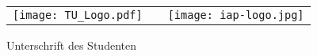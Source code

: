 \begin{titlepage}
	
	\begin{tabular}{lcr}
		\texttt{[image: TU\_Logo.pdf]} & %
		\hspace{1cm} \trunititel \hspace{2.5cm} &
		\texttt{[image: iap-logo.jpg]} %
		\\
	\end{tabular}

\begin{flushleft}
	Unterschrift des Studenten
\end{flushleft}
	
		\titlepagedecoration
	\end{titlepage}

